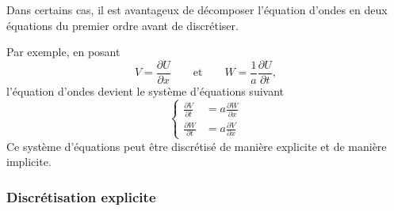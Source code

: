 Dans certains cas, il est avantageux de décomposer l'équation d'ondes en deux
équations du premier ordre avant de discrétiser.

Par exemple, en posant
\[
  V = \frac{\partial U}{\partial x} \qquad\text{et}\qquad
  W = \frac{1}{a}\frac{\partial U}{\partial t},
\]
l'équation d'ondes devient le système d'équations suivant
\[
  \left\{
  \begin{aligned}
    \frac{\partial V}{\partial t} &= a\frac{\partial W}{\partial x}\\[0.4em]
    \frac{\partial W}{\partial t} &= a\frac{\partial V}{\partial x}
  \end{aligned}
  \right.
\]
Ce système d'équations peut être discrétisé de manière explicite et de manière
implicite.

\subsubsection{Discrétisation explicite}

